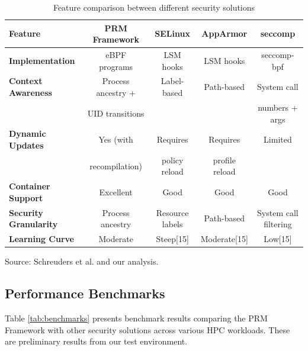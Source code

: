 \documentclass[conference]{IEEEtran}
\begin{document}
\begin{table}[htbp]
\caption{Feature comparison between different security solutions}
\label{tab:features}
\centering
\begin{tabular}{|l|c|c|c|c|}
\hline
\textbf{Feature} & \textbf{PRM Framework} & \textbf{SELinux} & \textbf{AppArmor} & \textbf{seccomp} \\
\hline
\textbf{Implementation} & eBPF programs & LSM hooks & LSM hooks & seccomp-bpf \\
\hline
\textbf{Context Awareness} & Process ancestry + & Label-based & Path-based & System call \\
 & UID transitions &  &  & numbers + args \\
\hline
\textbf{Dynamic Updates} & Yes (with & Requires & Requires & Limited \\
 & recompilation) & policy reload & profile reload &  \\
\hline
\textbf{Container Support} & Excellent & Good & Good & Good \\
\hline
\textbf{Security Granularity} & Process ancestry & Resource labels & Path-based & System call filtering \\
\hline
\textbf{Learning Curve} & Moderate & Steep[15] & Moderate[15] & Low[15] \\
\hline
\end{tabular}
\begin{tablenotes}
\small
\item Source: Schreuders et al. \cite{schreuders2011empowering} and our analysis.
\end{tablenotes}
\end{table}\subsection{Performance Benchmarks}
Table \ref{tab:benchmarks} presents benchmark results comparing the PRM Framework with other security solutions across various HPC workloads. These are preliminary results from our test environment.
\end{document}
